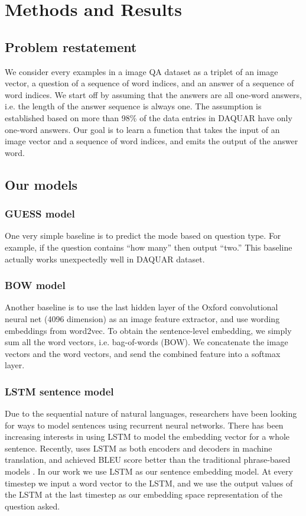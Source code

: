 \chapter{Methods and Results}
\section{Problem restatement}
We consider every examples in a image QA dataset as a triplet of an image vector, a question of a sequence of word indices, and an answer of a sequence of word indices. We start off by assuming that the answers are all one-word answers, i.e. the length of the answer sequence is always one. The assumption is established based on more than 98\% of the data entries in DAQUAR have only one-word answers. Our goal is to learn a function that takes the input of an image vector and a sequence of word indices, and emits the output of the answer word. 

\section{Our models}
\subsection{GUESS model}
One very simple baseline is to predict the mode based on question type. For example, if the question contains ``how many'' then output ``two.'' This baseline actually works unexpectedly well in DAQUAR dataset.

\subsection{BOW model}
Another baseline is to use the last hidden layer of the Oxford convolutional neural net (4096 dimension) \cite{simonyan14} as an image feature extractor, and use wording embeddings from word2vec. To obtain the sentence-level embedding, we simply sum all the word vectors, i.e. bag-of-words (BOW). We concatenate the image vectors and the word vectors, and send the combined feature into a softmax layer.

\subsection{LSTM sentence model}
Due to the sequential nature of natural languages, researchers have been looking for ways to model sentences using recurrent neural networks. There has been increasing interests in using LSTM to model the embedding vector for a whole sentence. Recently, \cite{sutskever14} uses LSTM as both encoders and decoders in machine translation, and achieved BLEU score \cite{bleu} better than the traditional phrase-based models \cite{luong14}. In our work we use LSTM as our sentence embedding model. At every timestep we input a word vector to the LSTM, and we use the output values of the LSTM at the last timestep as our embedding space representation of the question asked.


